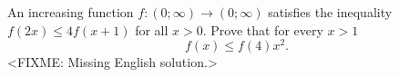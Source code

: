\problem
An increasing function $f \colon (0; \infty) \to (0; \infty)$ satisfies the
inequality $f (2 x) \leq 4 f (x + 1)$ for all $x > 0$.
Prove that for every $x > 1$
\[
    f(x) \leq f(4) x^2
.\]
\solution
<FIXME: Missing English solution.>
\endproblem

